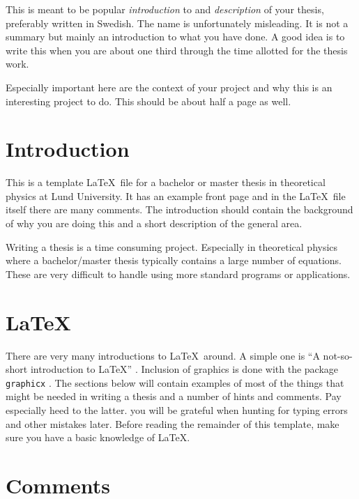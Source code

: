 \documentclass[a4paper,12pt]{article}
\begin{document}
This is meant to be popular \emph{introduction} to and
\emph{description} of your thesis, preferably
written in Swedish. The name is unfortunately misleading. It is not a summary
but mainly an introduction to what you have done. A good idea is to write this
when you are about one third through the time allotted for the thesis work.

Especially important here are the context of your project and why this is
an interesting project to do. This should be about half a page as well.

\vfill

\newpage

\tableofcontents
\listoffigures 
\listoftables

\newpage

\section{Introduction}
\setcounter{equation}{0}
\label{sec:introduction}


This is a template \LaTeX\ file for a bachelor or master thesis in theoretical
physics at Lund University. It has an example front page and in the \LaTeX\ file
itself there are many comments. The introduction should contain the background
of why you are doing this and a short description of the general area.

Writing a thesis is a time consuming project. Especially in theoretical physics
where a bachelor/master thesis typically contains a large number of equations.
These are very difficult to handle using more standard programs or
applications.

\section{\LaTeX}
\setcounter{equation}{0}

There are very many introductions to \LaTeX\ around. A simple one is
``A not-so-short introduction to \LaTeX'' \cite{notsoshort}.
Inclusion of graphics is done with the package {\tt graphicx} \cite{graphicx}.
The sections below will contain examples of most of the things that might be
needed in writing a thesis and a number of hints and comments.
Pay especially heed to the latter. you will be grateful when hunting for
typing errors and other mistakes later. Before reading the remainder
of this template, make sure you have a basic knowledge of \LaTeX.

\section{Comments}
\setcounter{equation}{0}
\end{document}
